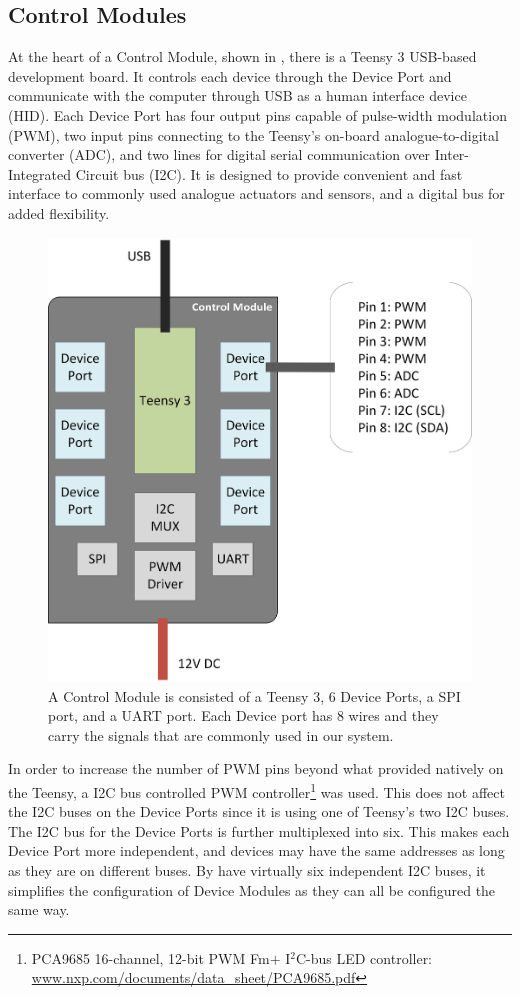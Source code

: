 \subsection{Control Modules}\label{subsec:controller}

At the heart of a Control Module, shown in , there is a Teensy 3 USB-based development board. It controls each device through the Device Port and communicate with the computer through USB as a human interface device (HID). Each Device Port has four output pins capable of pulse-width modulation (PWM), two input pins connecting to the Teensy's on-board analogue-to-digital converter (ADC), and two lines for digital serial communication over Inter-Integrated Circuit bus (I2C). It is designed to provide convenient and fast interface to commonly used analogue actuators and sensors, and a digital bus for added flexibility. 

\begin{figure}[!htbp]
	\centering
	\includegraphics[width=0.68 \textwidth]{"fig/interactive control system/Control_Module"}
	\caption[Block diagram of the Control Module]{A Control Module is consisted of a Teensy 3, 6 Device Ports, a SPI port, and a UART port. Each Device port has 8 wires and they carry the signals that are commonly used in our system.}
	\label{fig:Control_Module}
\end{figure}

In order to increase the number of PWM pins beyond what provided natively on the Teensy, a I2C bus controlled PWM controller\footnote{PCA9685 16-channel, 12-bit PWM Fm$+$ I$^2$C-bus LED controller: \url{www.nxp.com/documents/data_sheet/PCA9685.pdf}} was used. This does not affect the I2C buses on the Device Ports since it is using one of Teensy's two I2C buses. The I2C bus for the Device Ports is further multiplexed into six. This makes each Device Port more independent, and devices may have the same addresses as long as they are on different buses. By have virtually six independent I2C buses, it simplifies the configuration of Device Modules as they can all be configured the same way.

